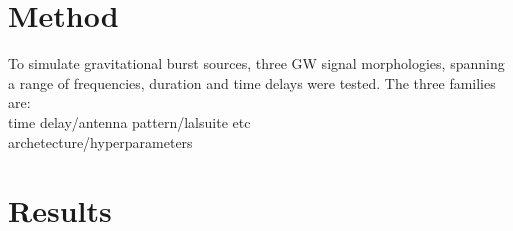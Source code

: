 \documentclass[%
 reprint,
 amsmath,amssymb,
 aps,
]{revtex4-2}
\begin{document}
\section{Method}
To simulate gravitational burst sources, three GW signal morphologies, spanning a range of frequencies, duration and time delays were tested. The three families are:\\

time delay/antenna pattern/lalsuite etc \\

archetecture/hyperparameters

\section{Results}



\end{document}
